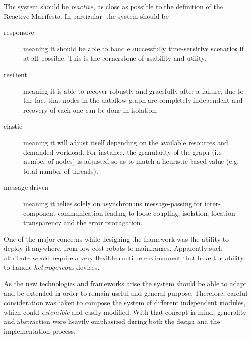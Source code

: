 \documentclass[sigplan,screen]{acmart}
\begin{document}
The system should be \textit{reactive}, as close as possible to the definition
of the Reactive Manifesto. In particular,
the system should be
\begin{description}
  \item[responsive] meaning it should be able to handle successfully time-sensitive scenarios if at all possible.
  This is the cornerstone of usability and utility.
  \item[resilient] meaning it is able to recover robustly and gracefully after
  a failure, due to the fact that nodes in the dataflow graph are completely
  independent and recovery of each one can be done in isolation.


  \item[elastic] meaning it will adjust itself depending on the available resources
  and demanded workload. For instance, the granularity of the graph (i.e. number of nodes)
  is adjusted so as to match a heuristic-based value (e.g. total number of threads).

  \item[message-driven] meaning it relies solely on asynchronous message-passing
  for inter-component communication leading to loose coupling, isolation, location
  transparency and the error propagation.
\end{description}

One of the major concerns while designing the framework was the ability to
deploy it anywhere, from low-cost robots to mainframes. Apparently such
attribute would require a very flexible runtime environment that have the ability to handle
\textit{heterogeneous} devices.

As the new technologies and frameworks arise the system should be able to adapt
and be extended in order to remain useful and general-purpose.
Therefore, careful consideration was taken to compose the system of different
independent modules, which could \textit{extensible} and easily modified. With that concept
in mind, generality and abstraction were heavily emphasized during both the design
and the implementation process.
\end{document}
